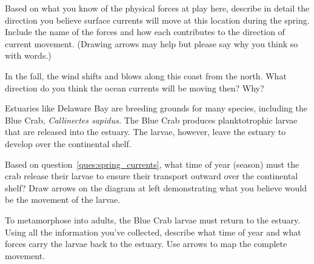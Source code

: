 \documentclass[12pt, addpoints]{exam}
\begin{document}
\begin{questions}

\question[4]
\label{ques:spring_currents}Based on what you know of the physical forces at play here, describe in detail the direction you believe surface currents will move at this location during the spring. Include the name of the forces and how each contributes to the direction of current movement. (Drawing arrows may help but please say why you think so with words.)


\newpage

\question[4]
In the fall, the wind shifts and blows along this coast from the north.  What direction do you think the ocean currents will be moving then? Why?




\begin{multicols}{2}


\columnbreak

Estuaries like Delaware Bay are breeding grounds for many species, including the Blue Crab, \textit{Callinectes sapidus.} The Blue Crab produces planktotrophic larvae that are released into the estuary. The larvae, however, leave the estuary to develop over the continental shelf.

\question[2]
Based on question~\ref{ques:spring_currents}, what time of year (season) must the crab release their larvae to ensure their transport outward over the continental shelf? Draw arrows on the diagram at left demonstrating what you believe would be the movement of the larvae.

\end{multicols}


\question[5]
To metamorphose into adults, the Blue Crab larvae must return to the estuary.  Using all the information you’ve collected, describe what time of year and what forces carry the larvae back to the estuary. Use arrows to map the complete movement.


\end{questions}
\end{document}
